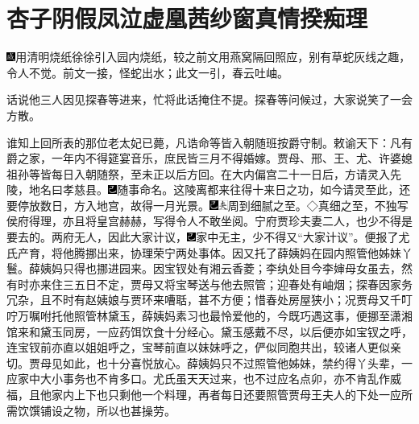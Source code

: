 

\chapter{杏子阴假凤泣虚凰\hspace{.5em}茜纱窗真情揆痴理}

{\includegraphics[width=3mm]{../Images/00005}用清明烧纸徐徐引入园内烧纸，较之前文用燕窝隔回照应，别有草蛇灰线之趣，令人不觉。前文一接，怪蛇出水；此文一引，春云吐岫。}

话说他三人因见探春等进来，忙将此话掩住不提。探春等问候过，大家说笑了一会方散。

谁知上回所表的那位老太妃已薨，凡诰命等皆入朝随班按爵守制。敕谕天下：凡有爵之家，一年内不得筵宴音乐，庶民皆三月不得婚嫁。贾母、邢、王、尤、许婆媳祖孙等皆每日入朝随祭，至未正以后方回。在大内偏宫二十一日后，方请灵入先陵，地名曰孝慈县。{\includegraphics[width=3mm]{../Images/00003}随事命名。}这陵离都来往得十来日之功，如今请灵至此，还要停放数日，方入地宫，故得一月光景。{\includegraphics[width=3mm]{../Images/00003}\includegraphics[width=3mm]{../Images/00012}\footnotesize \kaishu 周到细腻之至。◇真细之至，不独写侯府得理，亦且将皇宫赫赫，写得令人不敢坐阅。}宁府贾珍夫妻二人，也少不得是要去的。两府无人，因此大家计议，{\includegraphics[width=3mm]{../Images/00003}家中无主，少不得又``大家计议''。}便报了尤氏产育，将他腾挪出来，协理荣宁两处事体。因又托了薛姨妈在园内照管他姊妹丫鬟。薛姨妈只得也挪进园来。因宝钗处有湘云香菱；李纨处目今李婶母女虽去，然有时亦来住三五日不定，贾母又将宝琴送与他去照管；迎春处有岫烟；探春因家务冗杂，且不时有赵姨娘与贾环来嘈聒，甚不方便；惜春处房屋狭小；况贾母又千叮咛万嘱咐托他照管林黛玉，薛姨妈素习也最怜爱他的，今既巧遇这事，便挪至潇湘馆来和黛玉同房，一应药饵饮食十分经心。黛玉感戴不尽，以后便亦如宝钗之呼，连宝钗前亦直以姐姐呼之，宝琴前直以妹妹呼之，俨似同胞共出，较诸人更似亲切。贾母见如此，也十分喜悦放心。薛姨妈只不过照管他姊妹，禁约得丫头辈，一应家中大小事务也不肯多口。尤氏虽天天过来，也不过应名点卯，亦不肯乱作威福，且他家内上下也只剩他一个料理，再者每日还要照管贾母王夫人的下处一应所需饮馔铺设之物，所以也甚操劳。

